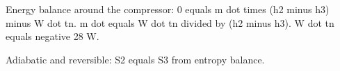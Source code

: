 Energy balance around the compressor:  
0 equals m dot times (h2 minus h3) minus W dot tn.  
m dot equals W dot tn divided by (h2 minus h3).  
W dot tn equals negative 28 W.  

Adiabatic and reversible:  
S2 equals S3 from entropy balance.
